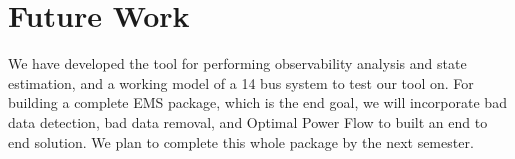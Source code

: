 \chapter{Future Work}
We have developed the tool for performing observability analysis and state estimation, and a working model of a 14 bus system to test our tool on. 
For building a complete EMS package, which is the end goal, we will incorporate bad data detection, bad data removal, and Optimal Power Flow to built an end to end solution. We plan to complete this whole package by the next semester.
